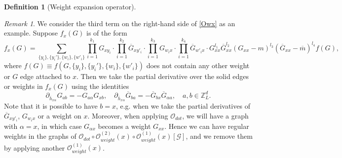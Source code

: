 \documentclass{article}
\newcommand{\1}{\mathds{1}}
\numberwithin{equation}{section}
\newcommand{\al}{\alpha}
\newcommand{\be}{\begin{equation}}
\newcommand{\ee}{\end{equation}}
\renewcommand{\cal}{\mathcal}
\newcommand{\Z}{\mathbb{Z}}
\theoremstyle{plain} %
\newtheorem{definition}[theorem]{Definition}
\theoremstyle{remark}
\newtheorem{remark}[theorem]{Remark}
\newcommand{\cor}{\color{red}}
\newcommand{\cob}{\color{purple}}
\newcommand{\hty}[1]{{\cor (ht: #1) }}
\begin{document}
\begin{definition} [Weight expansion operator]
\end{definition}

\iffalse
\begin{remark}\label{remark remove_reg}
We consider the third term on the right-hand side of \eqref{Owx} as an example. Suppose $f_x(G)$ is of the form
$$f_x(G)=\sum_{\{y_i\},\{y_i'\},\{w_i\},\{w'_i\}} \prod_{i=1}^{k_1}G_{x y_i}  \cdot  \prod_{i=1}^{k_2}\overline G_{x y'_i} \cdot \prod_{i=1}^{k_3} G_{ w_i x} \cdot \prod_{i=1}^{k_4}\overline G_{ w'_i x} \cdot G_{xx}^{l_1} \overline G_{xx}^{l_2}(G_{xx}-m)^{l_3} (\overline G_{xx}-\overline m)^{l_4}  f(G),$$
where $ f(G)\equiv f (G,\{y_i\},\{y_i'\},\{w_i\},\{w'_i\})$ does not contain any other weight or $G$ edge attached to $x$. Then we take the partial derivative over the solid edges or weights in $f_x(G)$ using the identities
\be\label{partialhG} \partial_{\overline h_{x\al}} G_{ab} = -G_{a\al}G_{xb}, \quad \partial_{\overline h_{x\al}} \overline G_{ba} =- \overline G_{bx}\overline G_{\al a},\quad a,b\in \Z_L^d.\ee
Note that it is possible to have $b=x$, e.g. when we take the partial derivatives of $\overline G_{x y'_i} $, $G_{ w_i x}$ or a weight on $x$. Moreover, when applying $\cal O_{dot}$, we will have a graph with $\al=x$, in which case $G_{\al x}$ becomes a weight $G_{xx}$. Hence we can have regular weights in the graphs of $\cal O_{dot} \circ  {\cal O}^{(2)}_{weight}(x) \circ {\cal O}^{(1)}_{weight}(x)  [\cal G]$, and we remove them by applying another ${\cal O}^{(1)}_{weight}(x)$.
%
\end{remark}
\end{document}
